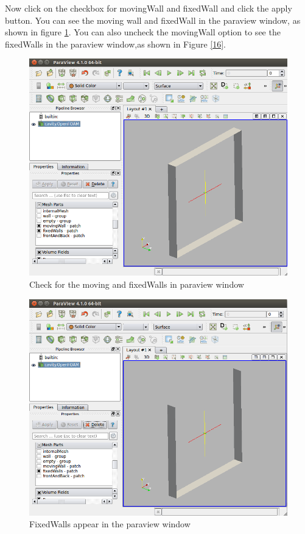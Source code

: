 \documentclass[a4paper,12pt]{report}
\begin{document}
\flushleft Now click on the checkbox for movingWall and fixedWall and click the apply button. You can see the moving wall and fixedWall in the paraview window, as shown in figure \ref{15}. You can also uncheck the movingWall option to see the fixedWalls in the paraview window,as shown in Figure \ref{16}.

\begin{figure}[ht]  
\begin{center}  
\includegraphics[scale=0.32]{15.png}
\caption{Check for the moving and fixedWalls in paraview window}
\label{15}
\end{center}  
\end{figure}

\begin{figure}[ht]  
\begin{center}  
\includegraphics[scale=0.32]{16.png}
\caption{FixedWalls appear in the paraview window}
\end{center}  
\end{figure}
\end{document}
